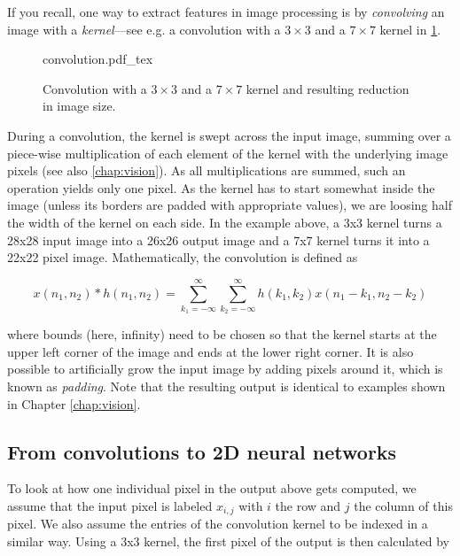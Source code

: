 If you recall, one way to extract features in image processing is by \textsl{convolving} an image with a \textsl{kernel}---see e.g. a convolution with a $3\times3$ and a $7\times7$ kernel in \cref{fig:convolution}.
%
\begin{figure}[htb]
    \centering
    \def\svgwidth{0.8\textwidth}
    {convolution.pdf_tex}
    \caption{Convolution with a $3\times3$ and a $7\times7$ kernel and resulting reduction in image size.\label{fig:convolution}}
\end{figure}
%
During a convolution, the kernel is swept across the input image, summing over a piece-wise multiplication of each element of the kernel with the underlying image pixels (see also \cref{chap:vision}). As all multiplications are summed, such an operation yields only one pixel. As the kernel has to start somewhat inside the image (unless its borders are padded with appropriate values), we are loosing half the width of the kernel on each side. In the example above, a 3x3 kernel turns a 28x28 input image into a 26x26 output image and a 7x7 kernel turns it into a 22x22 pixel image. Mathematically, the convolution is defined as

\begin{equation}
x(n_1,n_2)*h(n_1,n_2)=\sum_{k_1=-\infty}^{\infty} \sum_{k_2=-\infty}^{\infty} h(k_1,k_2)x(n_1-k_1,n_2-k_2)
\end{equation}

where bounds (here, infinity) need to be chosen so that the kernel starts at the upper left corner of the image and ends at the lower right corner. It is also possible to artificially grow the input image by adding pixels around it, which is known as \textsl{padding}. Note that the resulting output is identical to examples shown in Chapter \ref{chap:vision}.

\subsection{From convolutions to 2D neural networks}

To look at how one individual pixel in the output above gets computed, we assume that the input pixel is labeled $x_{i,j}$ with $i$ the row and $j$ the column of this pixel. We also assume the entries of the convolution kernel to be indexed in a similar way. Using a 3x3 kernel, the first pixel of the output is then calculated by

